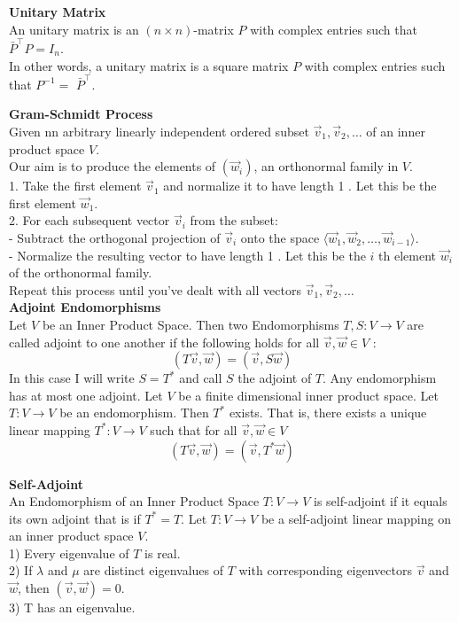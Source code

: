 \documentclass[a4paper, 10pt]{article}
\begin{document}
\begin{multicols*}{3}
\textbf{Unitary Matrix}\\
An unitary matrix is an $(n \times n)$-matrix $P$ with complex entries such that $\bar{P}^{\top} P=I_n$. \\
In other words, a unitary matrix is a square matrix $P$ with complex entries such that $P^{-1}=$ $\bar{P}^{\top}$.

\textbf{Gram-Schmidt Process}\\
Given nn arbitrary linearly independent ordered subset $\vec{v}_1, \vec{v}_2, \ldots$ of an inner product space $V$. \\
Our aim is to produce the elements of $(\vec{w}_i)$, an orthonormal family in $V$. \\
1. Take the first element $\vec{v}_1$ and normalize it to have length 1 . Let this be the first element $\vec{w}_1$.\\
2. For each subsequent vector $\vec{v}_i$ from the subset:\\
	- Subtract the orthogonal projection of $\vec{v}_i$ onto the space $\langle \vec{w}_1, \vec{w}_2, \ldots, \vec{w}_{i-1}\rangle$.\\
	- Normalize the resulting vector to have length 1 . Let this be the $i$ th element $\vec{w}_i$ of the orthonormal family.\\
Repeat this process until you've dealt with all vectors $\vec{v}_1, \vec{v}_2, \ldots$\\

\textbf{Adjoint Endomorphisms}\\
Let $V$ be an Inner Product Space. Then two Endomorphisms $T, S: V \rightarrow V$ are called adjoint to one another if the following holds for all $\vec{v}, \vec{w} \in V$ :
$$
(T \vec{v}, \vec{w})=(\vec{v}, S \vec{w})
$$
In this case I will write $S=T^*$ and call $S$ the adjoint of $T$.
Any endomorphism has at most one adjoint. 
Let $V$ be a finite dimensional inner product space. Let $T: V \rightarrow V$ be an endomorphism. Then $T^*$ exists. That is, there exists a unique linear mapping $T^*: V \rightarrow V$ such that for all $\vec{v}, \vec{w} \in V$
$$
(T \vec{v}, \vec{w})=\left(\vec{v}, T^* \vec{w}\right)
$$

\textbf{Self-Adjoint}\\
An Endomorphism of an Inner Product Space $T: V \rightarrow V$ is self-adjoint if it equals its own adjoint that is if $T^*=T$.
Let $T: V \rightarrow V$ be a self-adjoint linear mapping on an inner product space $V$.\\
1) Every eigenvalue of $T$ is real.\\
2) If $\lambda$ and $\mu$ are distinct eigenvalues of $T$ with corresponding eigenvectors $\vec{v}$ and $\vec{w}$, then $(\vec{v}, \vec{w})=0$.\\
3) T has an eigenvalue.


\end{multicols*}
\end{document}

